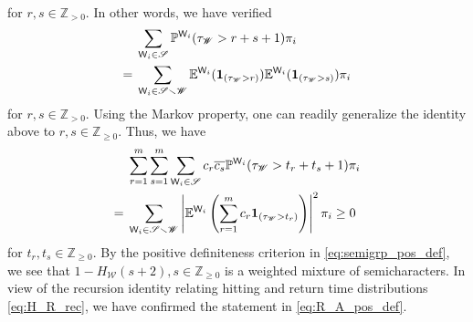 \documentclass[10pt,journal,compsoc]{IEEEtran}
\begin{document}
\begin{IEEEproof}
{\begin{align}
\end{align}}for $ r,s\in\mathbb Z_{>0}$. In other words, we have verified \begin{align}&
\sum_{\mathsf W_{i}\in\mathscr S}\mathbb P^{\mathsf W_i}(\tau_{\mathscr W}>r+s+1) \pi_i\notag\\={}&\sum_{\mathsf W_{i}\in\mathscr S\smallsetminus\mathscr W}\mathbb E^{\mathsf W_{i}}(\mathbf1_{(\tau_{\mathscr W}> r)})\mathbb E^{\mathsf W_{i}}(\mathbf1_{(\tau_{\mathscr W}> s)})\pi_{i}
\end{align} for $r,s\in\mathbb Z_{>0}$. Using the Markov property, one can readily generalize the identity above to $ r,s\in\mathbb Z_{\geq0}$.  Thus, we have \begin{align}&
\sum_{r=1}^m\sum_{s=1}^m\sum_{\mathsf W_{i}\in\mathscr S}c_r\overline{c_s}\mathbb P^{\mathsf W_i}(\tau_{\mathscr W}>t_{r}+t_{s}+1) \pi_i\notag\\={}&\sum_{\mathsf W_{i}\in\mathscr S\smallsetminus\mathscr W}\left\vert\mathbb E^{\mathsf W_{i}}\left(\sum_{r=1}^{m}c_r\mathbf1_{(\tau_{\mathscr W}> t_{r})}\right)\right\vert^{2}\pi_{i}\geq0
\end{align}for  $ t_r,t_s\in\mathbb Z_{\geq0}$. By the positive definiteness criterion in   \eqref{eq:semigrp_pos_def}, we see that $ 1-H_{\mathscr W}(s+2),s\in\mathbb Z_{\geq0}$ is a weighted mixture of semi\-characters. In view of the recursion identity relating   hitting and return time distributions \eqref{eq:H_R_rec}, we have confirmed the statement in \eqref{eq:R_A_pos_def}.
\end{IEEEproof}
\end{document}
